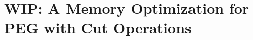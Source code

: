 \section{WIP: A Memory Optimization for PEG with Cut Operations}

\cite{Mizushima:2008}\cite{Mizushima:2010}
